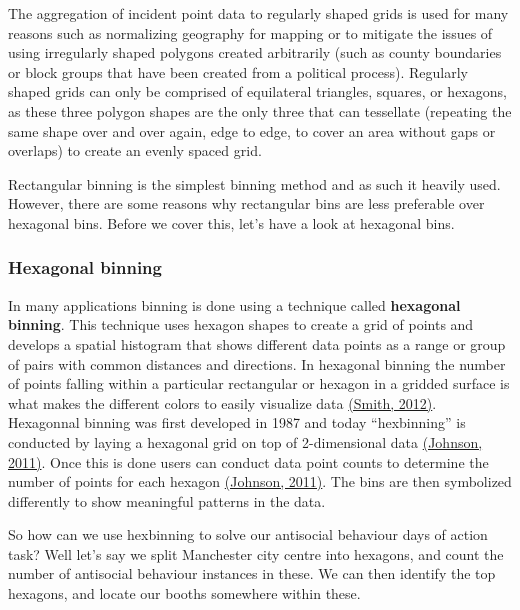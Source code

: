 \documentclass[
]{book}
\begin{document}
The aggregation of incident point data to regularly shaped grids is used for many reasons such as normalizing geography for mapping or to mitigate the issues of using irregularly shaped polygons created arbitrarily (such as county boundaries or block groups that have been created from a political process). Regularly shaped grids can only be comprised of equilateral triangles, squares, or hexagons, as these three polygon shapes are the only three that can tessellate (repeating the same shape over and over again, edge to edge, to cover an area without gaps or overlaps) to create an evenly spaced grid.

Rectangular binning is the simplest binning method and as such it heavily used. However, there are some reasons why rectangular bins are less preferable over hexagonal bins. Before we cover this, let's have a look at hexagonal bins.

\hypertarget{hexagonal-binning}{%
\subsubsection{Hexagonal binning}\label{hexagonal-binning}}

In many applications binning is done using a technique called \textbf{hexagonal binning}. This technique uses hexagon shapes to create a grid of points and develops a spatial histogram that shows different data points as a range or group of pairs with common distances and directions. In hexagonal binning the number of points falling within a particular rectangular or hexagon in a gridded surface is what makes the different colors to easily visualize data \href{https://www.mapbox.com/blog/binning-alternative-point-maps/}{(Smith, 2012)}. Hexagonnal binning was first developed in 1987 and today ``hexbinning'' is conducted by laying a hexagonal grid on top of 2-dimensional data \href{http://indiemaps.com/blog/2011/10/hexbins/}{(Johnson, 2011)}. Once this is done users can conduct data point counts to determine the number of points for each hexagon \href{http://indiemaps.com/blog/2011/10/hexbins/}{(Johnson, 2011)}. The bins are then symbolized differently to show meaningful patterns in the data.

So how can we use hexbinning to solve our antisocial behaviour days of action task? Well let's say we split Manchester city centre into hexagons, and count the number of antisocial behaviour instances in these. We can then identify the top hexagons, and locate our booths somewhere within these.
\end{document}
